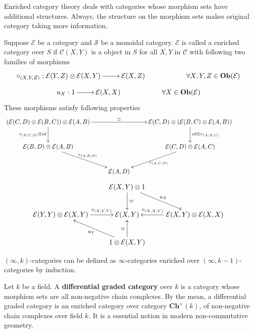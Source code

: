 Enriched category theory deals with categories whose morphism sets have additional structures. Always, the structure on the morphism sets makes original category taking more information.
\begin{mydefn}
Suppose $\mathcal{E}$ be a category and $\mathcal{S}$ be a monoidal category. $\mathcal{E}$ is called a enriched category over $S$ if $\mathcal{C}(X,Y)$ is a object in $S$ for all $X,Y$ in $\mathcal{C}$ with following two families of morphisms
\[
\xymatrix{
\circ_{(X,Y,Z)}: \mathcal{E}(Y,Z) \otimes \mathcal{E}(X,Y) \ar[r] & \mathcal{E}(X,Z)& & \forall X,Y,Z \in \textbf{Ob}(\mathcal{E})
}
\]
%
\[
\xymatrix{
u_X : 1 \ar[r] &\mathcal{E}(X,X)& & \forall X \in \textbf{Ob}(\mathcal{E})
}
\]
These morphisms satisfy following properties
\[
\xymatrix{
(\mathcal{E}(C,D) \otimes \mathcal{E}(B,C))\otimes \mathcal{E}(A,B) \ar[rr]^-{\simeq} \ar[d]_{\circ_{(B,C,D)} \otimes id}& &\mathcal{E}(C,D) \otimes (\mathcal{E}(B,C)\otimes \mathcal{E}(A,B)) \ar[d]^{id \otimes \circ_{(A,B,C)}}&\\ 
\mathcal{E}(B,D) \otimes \mathcal{E}(A,B) \ar[rd]^{\circ_{(A,B,D)}}& &\mathcal{E}(C,D) \otimes \mathcal{E}(A,C) \ar[ld]^{\circ_{(A,C,D)}}&\\
 &\mathcal{E}(A,D)& &
}
\]
\[
\xymatrix{
& &\mathcal{E}(X,Y) \otimes 1 \ar[d]^{\simeq} \ar[rd]^{u_X}& &\\
& \mathcal{E}(Y,Y) \otimes \mathcal{E}(X,Y) \ar[r]^-{\circ_{(X,Y,Y)}} &\mathcal{E}(X,Y)& \mathcal{E}(X,Y) \otimes \mathcal{E}(X,X) \ar[l]_-{\circ_{(X,X,Y)}}&\\
& &1 \otimes \mathcal{E}(X,Y) \ar[lu]^{u_Y} \ar[u]^{\simeq}& &
}
\]
\end{mydefn}
\begin{ex}
$(\infty, k)$-categories can be defined as $\infty$-categories enriched over $(\infty, k-1)$-categories by induction.
\end{ex}
\begin{ex}
Let $k$ be a field. A \textbf{differential graded category} over $k$ is a category whose morphism sets are all non-negative chain complexes. By the mean, a differential graded category is an enriched category over category $\mathbf{Ch}^{+}(k)$, of non-negative chain complexes over field $k$. It is a essential notion in modern non-commutative geometry.
\end{ex}

